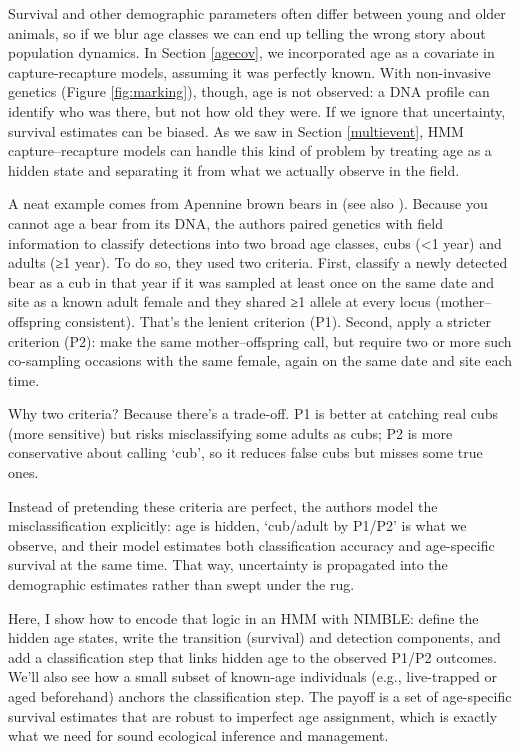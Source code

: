 \documentclass[
  12pt,
]{krantz}
\begin{document}
Survival and other demographic parameters often differ between young and older animals, so if we blur age classes we can end up telling the wrong story about population dynamics. In Section \ref{agecov}, we incorporated age as a covariate in capture-recapture models, assuming it was perfectly known. With non-invasive genetics (Figure \ref{fig:marking}), though, age is not observed: a DNA profile can identify who was there, but not how old they were. If we ignore that uncertainty, survival estimates can be biased. As we saw in Section \ref{multievent}, HMM capture--recapture models can handle this kind of problem by treating age as a hidden state and separating it from what we actually observe in the field.

A neat example comes from Apennine brown bears in \citet{Gervasi2017} (see also \citet{gowan2021uncertainty}). Because you cannot age a bear from its DNA, the authors paired genetics with field information to classify detections into two broad age classes, cubs (\textless1 year) and adults (≥1 year). To do so, they used two criteria. First, classify a newly detected bear as a cub in that year if it was sampled at least once on the same date and site as a known adult female and they shared ≥1 allele at every locus (mother--offspring consistent). That's the lenient criterion (P1). Second, apply a stricter criterion (P2): make the same mother--offspring call, but require two or more such co-sampling occasions with the same female, again on the same date and site each time.

Why two criteria? Because there's a trade-off. P1 is better at catching real cubs (more sensitive) but risks misclassifying some adults as cubs; P2 is more conservative about calling `cub', so it reduces false cubs but misses some true ones.

Instead of pretending these criteria are perfect, the authors model the misclassification explicitly: age is hidden, `cub/adult by P1/P2' is what we observe, and their model estimates both classification accuracy and age-specific survival at the same time. That way, uncertainty is propagated into the demographic estimates rather than swept under the rug.

Here, I show how to encode that logic in an HMM with NIMBLE: define the hidden age states, write the transition (survival) and detection components, and add a classification step that links hidden age to the observed P1/P2 outcomes. We'll also see how a small subset of known-age individuals (e.g., live-trapped or aged beforehand) anchors the classification step. The payoff is a set of age-specific survival estimates that are robust to imperfect age assignment, which is exactly what we need for sound ecological inference and management.
\end{document}
